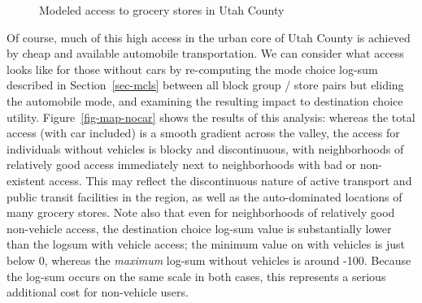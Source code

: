 \documentclass[
  letterpaper,
  number,
  review,
  doubleblind,
  3p]{elsarticle}
\begin{document}
\begin{figure}


\caption{\label{fig-map-ut}Modeled access to grocery stores in Utah
County}

\end{figure}%

Of course, much of this high access in the urban core of Utah County is
achieved by cheap and available automobile transportation. We can
consider what access looks like for those without cars by re-computing
the mode choice log-sum described in Section~\ref{sec-mcls} between all
block group / store pairs but eliding the automobile mode, and examining
the resulting impact to destination choice utility.
Figure~\ref{fig-map-nocar} shows the results of this analysis: whereas
the total access (with car included) is a smooth gradient across the
valley, the access for individuals without vehicles is blocky and
discontinuous, with neighborhoods of relatively good access immediately
next to neighborhoods with bad or non-existent access. This may reflect
the discontinuous nature of active transport and public transit
facilities in the region, as well as the auto-dominated locations of
many grocery stores. Note also that even for neighborhoods of relatively
good non-vehicle access, the destination choice log-sum value is
substantially lower than the logsum with vehicle access; the minimum
value on with vehicles is just below 0, whereas the \emph{maximum}
log-sum without vehicles is around -100. Because the log-sum occurs on
the same scale in both cases, this represents a serious additional cost
for non-vehicle users.

\begin{sidewaysfigure}

\begin{minipage}{0.50\linewidth}



\end{minipage}%
%
\begin{minipage}{0.50\linewidth}



\end{minipage}%

\caption{\label{fig-map-nocar}Access to groceries in Salt Lake County
with and without a vehicle.}

\end{sidewaysfigure}%
\end{document}
